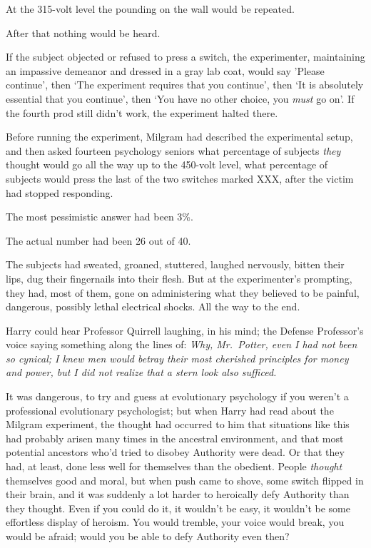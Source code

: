 At the 315-volt level the pounding on the wall would be repeated.

After that nothing would be heard.

If the subject objected or refused to press a switch, the experimenter, 
maintaining an impassive demeanor and dressed in a gray lab coat, would say 
'Please continue', then `The experiment requires that you continue', then `It 
is absolutely essential that you continue', then `You have no other choice, you 
\emph{must} go on'. If the fourth prod still didn't work, the experiment halted 
there.

Before running the experiment, Milgram had described the experimental setup, 
and then asked fourteen psychology seniors what percentage of subjects 
\emph{they} thought would go all the way up to the 450-volt level, what 
percentage of subjects would press the last of the two switches marked XXX, 
after the victim had stopped responding.

The most pessimistic answer had been 3\%.

The actual number had been 26 out of 40.

The subjects had sweated, groaned, stuttered, laughed nervously, bitten their 
lips, dug their fingernails into their flesh. But at the experimenter's 
prompting, they had, most of them, gone on administering what they believed to 
be painful, dangerous, possibly lethal electrical shocks. All the way to the 
end.

Harry could hear Professor Quirrell laughing, in his mind; the Defense 
Professor's voice saying something along the lines of: \emph{Why, Mr.~Potter, 
even I had not been so cynical; I knew men would betray their most cherished 
principles for money and power, but I did not realize that a stern look also 
sufficed.}

It was dangerous, to try and guess at evolutionary psychology if you weren't a 
professional evolutionary psychologist; but when Harry had read about the 
Milgram experiment, the thought had occurred to him that situations like this 
had probably arisen many times in the ancestral environment, and that most 
potential ancestors who'd tried to disobey Authority were dead. Or that they 
had, at least, done less well for themselves than the obedient. People 
\emph{thought} themselves good and moral, but when push came to shove, some 
switch flipped in their brain, and it was suddenly a lot harder to heroically 
defy Authority than they thought. Even if you could do it, it wouldn't be easy, 
it wouldn't be some effortless display of heroism. You would tremble, your 
voice would break, you would be afraid; would you be able to defy Authority 
even then?

